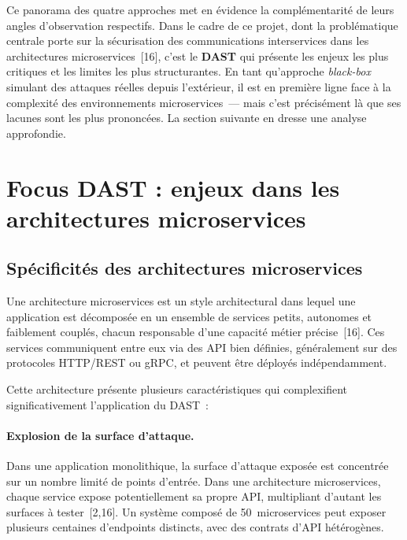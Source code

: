 \noindent
Ce panorama des quatre approches met en évidence la complémentarité de leurs
angles d'observation respectifs. Dans le cadre de ce projet, dont la
problématique centrale porte sur la sécurisation des communications interservices
dans les architectures microservices~[16], c'est le \textbf{DAST} qui présente
les enjeux les plus critiques et les limites les plus structurantes. En tant
qu'approche \textit{black-box} simulant des attaques réelles depuis l'extérieur,
il est en première ligne face à la complexité des environnements
microservices~--- mais c'est précisément là que ses lacunes sont les plus
prononcées. La section suivante en dresse une analyse approfondie.

\section{Focus DAST : enjeux dans les architectures microservices}
\label{sec:dast-micro}

\subsection{Spécificités des architectures microservices}

Une architecture microservices est un style architectural dans lequel une
application est décomposée en un ensemble de services petits, autonomes et
faiblement couplés, chacun responsable d'une capacité métier précise~[16]. Ces
services communiquent entre eux via des API bien définies, généralement sur des
protocoles HTTP/REST ou gRPC, et peuvent être déployés indépendamment.

Cette architecture présente plusieurs caractéristiques qui complexifient
significativement l'application du DAST~:

\paragraph{Explosion de la surface d'attaque.}
Dans une application monolithique, la surface d'attaque exposée est concentrée
sur un nombre limité de points d'entrée. Dans une architecture microservices,
chaque service expose potentiellement sa propre API, multipliant d'autant les
surfaces à tester~[2,16]. Un système composé de 50~microservices peut exposer
plusieurs centaines d'endpoints distincts, avec des contrats d'API hétérogènes.

